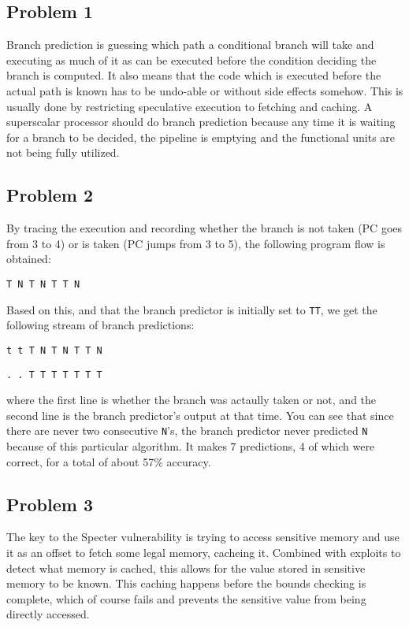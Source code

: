 \documentclass[12pt,letterpaper]{article}
\begin{document}
\subsection*{Problem 1}

Branch prediction is guessing which path a conditional branch will take and executing as much of it
as can be executed before the condition deciding the branch is computed. It also means that the code
which is executed before the actual path is known has to be undo-able or without side effects
somehow. This is usually done by restricting speculative execution to fetching and caching.
A superscalar processor should do branch prediction because any time it is waiting for a branch to
be decided, the pipeline is emptying and the functional units are not being fully utilized.

\subsection*{Problem 2}

By tracing the execution and recording whether the branch is not taken (PC goes from 3 to 4) or is
taken (PC jumps from 3 to 5), the following program flow is obtained:

\noindent
\lstinline{T N T N T T N }

Based on this, and that the branch predictor is initially set to \lstinline{TT}, we get the
following stream of branch predictions:


\noindent
\lstinline{t t T N T N T T N}

\noindent
\lstinline{. . T T T T T T T}

\noindent
where the first line is whether the branch was actaully taken or not, and the second line is the
branch predictor's output at that time. You can see that since there are never two consecutive
\lstinline{N}'s, the branch predictor never predicted \lstinline{N} because of this particular
algorithm. It makes 7 predictions, 4 of which were correct, for a total of about 57\% accuracy.

\subsection*{Problem 3}

The key to the Specter vulnerability is trying to access sensitive memory and use it as an offset to
fetch some legal memory, cacheing it. Combined with exploits to detect what memory is cached, this
allows for the value stored in sensitive memory to be known. This caching happens before the bounds
checking is complete, which of course fails and prevents the sensitive value from being directly
accessed.
\end{document}
